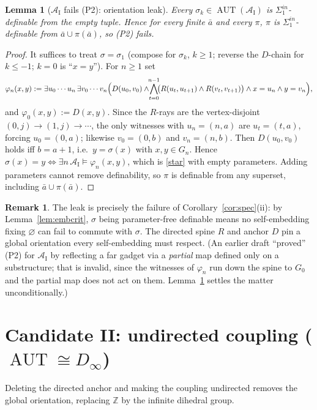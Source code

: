 \documentclass[12pt,fullpage]{article}
\newtheorem{lemma}[theorem]{Lemma}
\theoremstyle{definition}
\newtheorem{remark}[theorem]{Remark}
\newcommand{\A}{\mathcal{A}}
\newcommand{\Z}{{\mathbb{Z}}}
\newcommand{\AUT}{\operatorname{AUT}}
\renewcommand{\phi}{\varphi}
\begin{document}
\begin{lemma}[$\A_{\mathrm{I}}$ fails (P2): orientation leak]\label{lem:AI-fail}
Every $\sigma_k\in\AUT(\A_{\mathrm{I}})$ is $\Sigma^{in}_1$-definable from the
\emph{empty} tuple.  Hence for every finite $\bar a$ and every $\pi$, $\pi$ is
$\Sigma^{in}_1$-definable from $\bar a\cup\pi(\bar a)$, so (P2) fails.
\end{lemma}

\begin{proof}
It suffices to treat $\sigma=\sigma_1$ (compose for $\sigma_k$, $k\ge1$; reverse
the $D$-chain for $k\le-1$; $k=0$ is ``$x=y$'').  For $n\ge1$ set
\[
\phi_n(x,y):=\exists u_0\cdots u_n\,\exists v_0\cdots v_n\Bigl(
D(u_0,v_0)\wedge\!\!\bigwedge_{t=0}^{n-1}\!\!\bigl(R(u_t,u_{t+1})\wedge R(v_t,v_{t+1})\bigr)
\wedge x=u_n\wedge y=v_n\Bigr),
\]
and $\phi_0(x,y):=D(x,y)$.  Since the $R$-rays are the vertex-disjoint
$(0,j)\to(1,j)\to\cdots$, the only witnesses with $u_n=(n,a)$ are $u_t=(t,a)$,
forcing $u_0=(0,a)$; likewise $v_0=(0,b)$ and $v_n=(n,b)$.  Then $D(u_0,v_0)$
holds iff $b=a+1$, i.e.\ $y=\sigma(x)$ with $x,y\in G_n$.  Hence
$\sigma(x)=y\iff\exists n\,\A_{\mathrm{I}}\models\phi_n(x,y)$, which is
\eqref{star} with empty parameters.  Adding parameters cannot remove
definability, so $\pi$ is definable from any superset, including
$\bar a\cup\pi(\bar a)$.
\end{proof}

\begin{remark}\label{rem:I-diag}
The leak is precisely the failure of Corollary~\ref{cor:spec}(ii): by
Lemma~\ref{lem:embcrit}, $\sigma$ being parameter-free definable means no
self-embedding fixing $\varnothing$ can fail to commute with $\sigma$.  The
directed spine $R$ and anchor $D$ pin a global orientation every self-embedding
must respect.  (An earlier draft ``proved'' (P2) for $\A_{\mathrm{I}}$ by
reflecting a far gadget via a \emph{partial} map defined only on a substructure;
that is invalid, since the witnesses of $\phi_n$ run down the spine to $G_0$ and
the partial map does not act on them.  Lemma~\ref{lem:AI-fail} settles the matter
unconditionally.)
\end{remark}

\section{Candidate II: undirected coupling ($\AUT\cong D_\infty$)}\label{sec:candII}

Deleting the directed anchor and making the coupling undirected removes the
global orientation, replacing $\Z$ by the infinite dihedral group.
\end{document}
